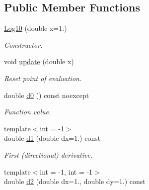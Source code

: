 \subsection*{Public Member Functions}
\begin{DoxyCompactItemize}
\item 
\hyperlink{structRFFGen_1_1CMath_1_1Log10_a34ec695de7574539a7ab0c9f82773aee}{Log10} (double x=1.)
\begin{DoxyCompactList}\small\item\em Constructor. \end{DoxyCompactList}\item 
\hypertarget{structRFFGen_1_1CMath_1_1Log10_a30722b597e5b2cc7a38518fff7abb87a}{void \hyperlink{structRFFGen_1_1CMath_1_1Log10_a30722b597e5b2cc7a38518fff7abb87a}{update} (double x)}\label{structRFFGen_1_1CMath_1_1Log10_a30722b597e5b2cc7a38518fff7abb87a}

\begin{DoxyCompactList}\small\item\em Reset point of evaluation. \end{DoxyCompactList}\item 
\hypertarget{structRFFGen_1_1CMath_1_1Log10_a7f8d8fe13e5f3287a8b4baef1b29b600}{double \hyperlink{structRFFGen_1_1CMath_1_1Log10_a7f8d8fe13e5f3287a8b4baef1b29b600}{d0} () const noexcept}\label{structRFFGen_1_1CMath_1_1Log10_a7f8d8fe13e5f3287a8b4baef1b29b600}

\begin{DoxyCompactList}\small\item\em Function value. \end{DoxyCompactList}\item 
\hypertarget{structRFFGen_1_1CMath_1_1Log10_a80064263bb47d44403dd4725279ff5e8}{{\footnotesize template$<$int  = -\/1$>$ }\\double \hyperlink{structRFFGen_1_1CMath_1_1Log10_a80064263bb47d44403dd4725279ff5e8}{d1} (double dx=1.) const }\label{structRFFGen_1_1CMath_1_1Log10_a80064263bb47d44403dd4725279ff5e8}

\begin{DoxyCompactList}\small\item\em First (directional) derivative. \end{DoxyCompactList}\item 
\hypertarget{structRFFGen_1_1CMath_1_1Log10_aa53762004f57b286a20fd3b91d1ecb3d}{{\footnotesize template$<$int  = -\/1, int  = -\/1$>$ }\\double \hyperlink{structRFFGen_1_1CMath_1_1Log10_aa53762004f57b286a20fd3b91d1ecb3d}{d2} (double dx=1., double dy=1.) const }\label{structRFFGen_1_1CMath_1_1Log10_aa53762004f57b286a20fd3b91d1ecb3d}


\end{DoxyCompactItemize}
